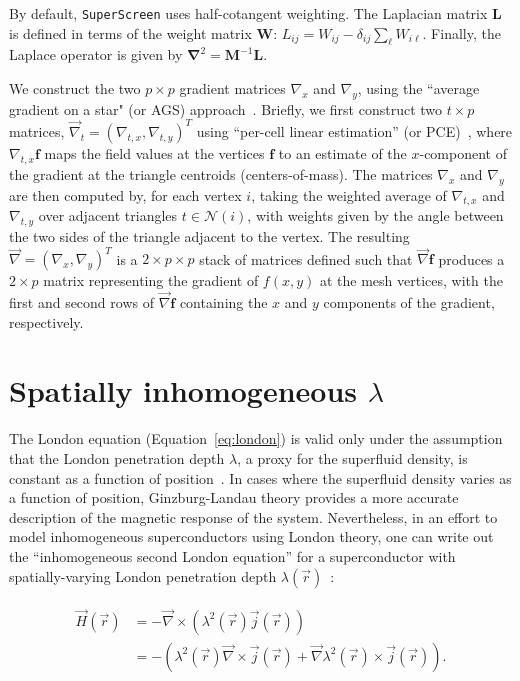 \documentclass[final,3p,times,twocolumn]{elsarticle}
\newcommand{\inline}[1]{\texttt{#1}\xspace}
\newcommand{\SuperScreen}{\inline{SuperScreen}}
\newcounter{bla}
\begin{document}
By default, \SuperScreen uses half-cotangent weighting. The Laplacian matrix $\mathbf{L}$ is defined in terms of the weight matrix $\mathbf{W}$: $L_{ij} = W_{ij} - \delta_{ij}\sum_{\ell}W_{i\ell}$. Finally, the Laplace operator is given by $\mathbf{\nabla}^2 = \mathbf{M}^{-1}\mathbf{L}$.

We construct the two $p\times p$ gradient matrices $\nabla_x$ and $\nabla_y$, using the ``average gradient on a star" (or AGS) approach~\cite{Mancinelli2019-ci}. Briefly, we first construct two $t\times p$ matrices, $\vec{\nabla}_t=(\nabla_{t,x}, \nabla_{t,y})^T$ using ``per-cell linear estimation'' (or PCE)~\cite{Mancinelli2019-ci}, where $\nabla_{t,x}\mathbf{f}$ maps the field values at the vertices $\mathbf{f}$ to an estimate of the $x$-component of the gradient at the triangle centroids (centers-of-mass). The matrices $\nabla_x$ and $\nabla_y$ are then computed by, for each vertex $i$, taking the weighted average of $\nabla_{t,x}$ and $\nabla_{t,y}$ over adjacent triangles $t\in\mathcal{N}(i)$, with weights given by the angle between the two sides of the triangle adjacent to the vertex. The resulting $\vec{\nabla}=(\nabla_x, \nabla_y)^T$ is a $2\times p\times p$ stack of matrices defined such that $\vec{\nabla}\mathbf{f}$ produces a $2\times p$ matrix representing the gradient of $f(x, y)$ at the mesh vertices, with the first and second rows of $\vec{\nabla}\mathbf{f}$ containing the $x$ and $y$ components of the gradient, respectively.

\section{Spatially inhomogeneous $\lambda$}
\label{appendix:inhomogeneous}

The London equation (Equation~\ref{eq:london}) is valid only under the assumption that the London penetration depth $\lambda$, a proxy for the superfluid density, is constant as a function of position~\cite{Tinkham2004-zn}. In cases where the superfluid density varies as a function of position, Ginzburg-Landau theory provides a more accurate description of the magnetic response of the system. Nevertheless, in an effort to model inhomogeneous superconductors using London theory, one can write out the ``inhomogeneous second London equation'' for a superconductor with spatially-varying London penetration depth $\lambda(\vec{r})$~\cite{Cave1986-js, Kogan2011-zn}:

\begin{align}
\begin{split}
    \label{eq:london_inhomogeneous_3d}
    \vec{H}(\vec{r})&=-\vec{\nabla}\times\left(\lambda^2(\vec{r})\vec{j}(\vec{r})\right)\\
    &=-\left(\lambda^2(\vec{r})\vec{\nabla}\times\vec{j}(\vec{r}) + \vec{\nabla}\lambda^2(\vec{r})\times\vec{j}(\vec{r})\right).
\end{split}
\end{align}
\end{document}
